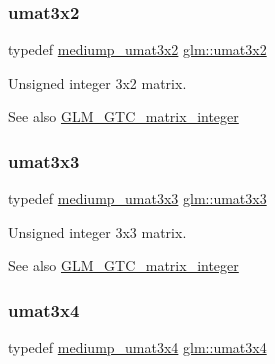 \subsubsection{\texorpdfstring{umat3x2}{umat3x2}}
{\footnotesize\ttfamily typedef \mbox{\hyperlink{group__gtc__matrix__integer_gad27333d041d86c7b0b78010c5a437846}{mediump\+\_\+umat3x2}} \mbox{\hyperlink{group__gtc__matrix__integer_ga257300f2710612877ef45438a366e308}{glm\+::umat3x2}}}

Unsigned integer 3x2 matrix. \begin{DoxySeeAlso}{See also}
\mbox{\hyperlink{group__gtc__matrix__integer}{G\+L\+M\+\_\+\+G\+T\+C\+\_\+matrix\+\_\+integer}} 
\end{DoxySeeAlso}
\mbox{\label{group__gtc__matrix__integer_gab80b6501ba1b2c40119a0f2d256f4c97}} 
\subsubsection{\texorpdfstring{umat3x3}{umat3x3}}
{\footnotesize\ttfamily typedef \mbox{\hyperlink{group__gtc__matrix__integer_gac2563a9d45e3f6be0ceaf62b50a983f5}{mediump\+\_\+umat3x3}} \mbox{\hyperlink{group__gtc__matrix__integer_gab80b6501ba1b2c40119a0f2d256f4c97}{glm\+::umat3x3}}}

Unsigned integer 3x3 matrix. \begin{DoxySeeAlso}{See also}
\mbox{\hyperlink{group__gtc__matrix__integer}{G\+L\+M\+\_\+\+G\+T\+C\+\_\+matrix\+\_\+integer}} 
\end{DoxySeeAlso}
\mbox{\label{group__gtc__matrix__integer_ga5410857d098a989a30b4017100bc2ff7}} 
\subsubsection{\texorpdfstring{umat3x4}{umat3x4}}
{\footnotesize\ttfamily typedef \mbox{\hyperlink{group__gtc__matrix__integer_ga22e32b4dcd60655044ebbd30f50a2e67}{mediump\+\_\+umat3x4}} \mbox{\hyperlink{group__gtc__matrix__integer_ga5410857d098a989a30b4017100bc2ff7}{glm\+::umat3x4}}}

